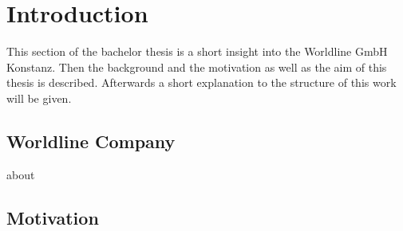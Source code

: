 \section{Introduction} 

This section of the bachelor thesis is a short insight into the Worldline GmbH Konstanz. Then the background and the motivation as well as the aim of this thesis is described. Afterwards a short explanation to the structure of this work will be given.

\subsection{Worldline Company}
about 
\cite{1}
\subsection{Motivation}


